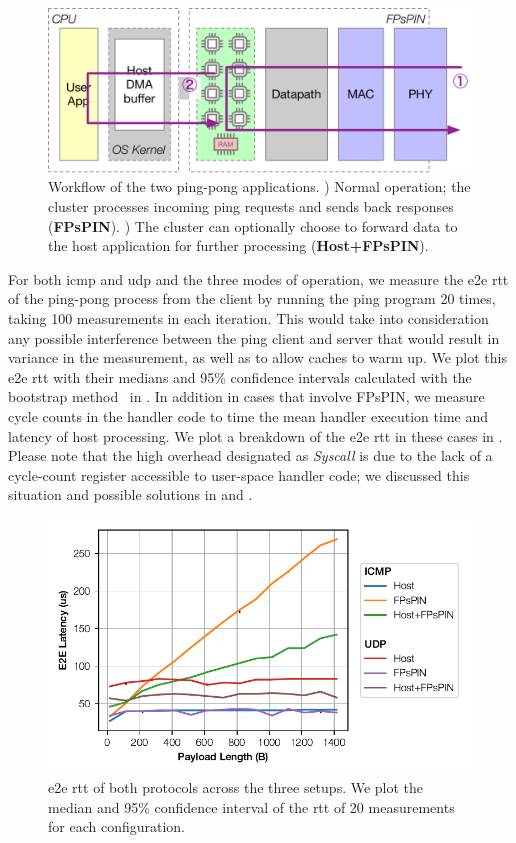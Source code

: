 \begin{figure}
    \centering
    \includegraphics[width=.8\textwidth]{figures/demo-apps.pdf}
    \caption[Workflow of the ping-pong demo]{Workflow of the two ping-pong applications.  ) Normal operation; the cluster processes incoming ping requests and sends back responses (\textbf{FPsPIN}).  ) The cluster can optionally choose to forward data to the host application for further processing (\textbf{Host+FPsPIN}).} \label{fig:demo-pingpong}
\end{figure}

For both \ac{icmp} and \ac{udp} and the three modes of operation, we measure the \ac{e2e} \ac{rtt} of the ping-pong process from the client by running the ping program 20 times, taking 100 measurements in each iteration.  This would take into consideration any possible interference between the ping client and server that would result in variance in the measurement, as well as to allow caches to warm up.  We plot this \ac{e2e} \ac{rtt} with their medians and 95\% confidence intervals calculated with the bootstrap method~\cite{diciccio_bootstrap_1996} in .  In addition in cases that involve FPsPIN, we measure cycle counts in the handler code to time the mean handler execution time and latency of host processing.  We plot a breakdown of the \ac{e2e} \ac{rtt} in these cases in .  Please note that the high overhead designated as \emph{Syscall} is due to the lack of a cycle-count register accessible to user-space handler code; we discussed this situation and possible solutions in  and .

\begin{figure}[tp]
    \centering
    \includegraphics{thesis/figures/pingpong-lat.pdf}
    \caption{\ac{e2e} \ac{rtt} of both protocols across the three setups.  We plot the median and 95\% confidence interval of the \ac{rtt} of 20 measurements for each configuration.} \label{fig:pingpong-lat}
\end{figure}

